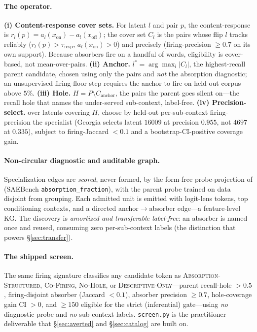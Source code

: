 \documentclass[11pt,letterpaper]{article}
\begin{document}
\paragraph{The operator.} \textbf{(i) Content-response cover sets.} For latent $l$ and pair $p$, the content-response is $r_l(p)=a_l(x_{\text{on}})-a_l(x_{\text{off}})$; the cover set $C_l$ is the pairs whose flip $l$ tracks reliably ($r_l(p)>\tau_{\text{resp}}$, $a_l(x_{\text{on}})>0$) and precisely (firing-precision $\ge0.7$ on its own support). Because absorbers fire on a handful of words, eligibility is cover-based, not mean-over-pairs. \textbf{(ii) Anchor.} $l^{*}=\arg\max_l|C_l|$, the highest-recall parent candidate, chosen using only the pairs and \emph{not} the absorption diagnostic; an unsupervised firing-floor step requires the anchor to fire on held-out corpus above $5\%$. \textbf{(iii) Hole.} $H=P\setminus C_{\text{anchor}}$, the pairs the parent goes silent on---the recall hole that names the under-served sub-context, label-free. \textbf{(iv) Precision-select.} over latents covering $H$, choose by held-out per-sub-context firing-precision the specialist (Georgia selects latent $16009$ at precision $0.955$, not $4697$ at $0.335$), subject to firing-Jaccard $<0.1$ and a bootstrap-CI-positive coverage gain.

\paragraph{Non-circular diagnostic and auditable graph.} Specialization edges are \emph{scored}, never formed, by the form-free probe-projection of \citet{Chanin2024} (SAEBench \texttt{absorption\_fraction}), with the parent probe trained on data disjoint from grouping. Each admitted unit is emitted with logit-lens tokens, top conditioning contexts, and a directed anchor$\to$absorber edge---a feature-level KG. The discovery is \emph{amortized and transferable label-free}: an absorber is named once and reused, consuming zero per-sub-context labels (the distinction that powers \S\ref{sec:transfer}).

\paragraph{The shipped screen.} The same firing signature classifies any candidate token as \textsc{Absorption-Structured}, \textsc{Co-Firing}, \textsc{No-Hole}, or \textsc{Descriptive-Only}---parent recall-hole $>0.5$, firing-disjoint absorber (Jaccard $<0.1$), absorber precision $\ge0.7$, hole-coverage gain CI $>0$, and $\ge150$ eligible for the strict (inferential) gate---using \emph{no} diagnostic probe and \emph{no} sub-context labels. \texttt{screen.py} is the practitioner deliverable that \S\ref{sec:averted} and \S\ref{sec:catalog} are built on.
\end{document}
